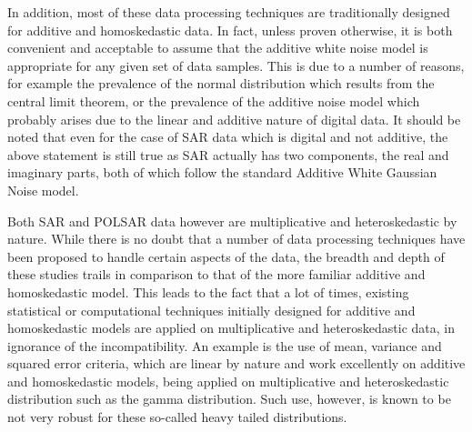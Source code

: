 In addition, most of these data processing techniques are traditionally designed for additive and homoskedastic data.
In fact, unless proven otherwise, it is both convenient and acceptable to assume that the additive white noise model is appropriate for any given set of data samples.
This is due to a number of reasons, for example the prevalence of the normal distribution which results from the central limit theorem, or the prevalence of the additive noise model which probably arises due to the linear and additive nature of digital data. %
It should be noted that even for the case of SAR data which is digital and not additive,
  the above statement is still true as SAR actually has two components, the real and imaginary parts,
  both of which follow the standard Additive White Gaussian Noise model.

Both SAR and POLSAR data however are multiplicative and heteroskedastic by nature.
While there is no doubt that a number of data processing techniques have been proposed to handle certain aspects of the data, the breadth and depth of these studies trails in comparison to that of the more familiar additive and homoskedastic model.
This leads to the fact that a lot of times, existing statistical or computational techniques initially designed for additive and homoskedastic models are applied on multiplicative and heteroskedastic data, in ignorance of the incompatibility. 
An example is the use of mean, variance and squared error criteria, which are linear by nature and work excellently on additive and homoskedastic models, being applied on multiplicative and heteroskedastic distribution such as the gamma distribution.
Such use, however, is known to be not very robust for these so-called heavy tailed distributions.

